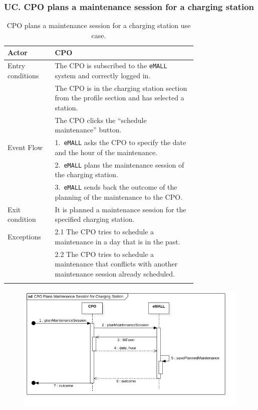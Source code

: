 \subsubsection*{UC\cuc . CPO plans a maintenance session for a charging station}
\begin{center}
    \begin{longtable}{lp{0.75\linewidth}}
        \hline
        Actor            & CPO                                                                                                            \\
        \hline
        Entry conditions & The CPO is subscribed to the \verb|eMALL| system and correctly logged in.                                      \\
        & The CPO is in the charging station section from the profile section and has selected a station.                \\
        & The CPO clicks the ``schedule maintenance'' button.                                                            \\
        \hline
        Event Flow       & 1.\ \verb|eMALL| asks the CPO to specify the date and the hour of the maintenance.                             \\
        & 2.\ \verb|eMALL| plans the maintenance session of the charging station.                                        \\
        & 3.\ \verb|eMALL| sends back the outcome of the planning of the maintenance to the CPO.                         \\
        \hline
        Exit condition   & It is planned a maintenance session for the specified charging station.                                        \\
        \hline
        Exceptions       & 2.1 The CPO tries to schedule a maintenance in a day that is in the past.                                      \\
        & 2.2 The CPO tries to schedule a maintenance that conflicts with another maintenance session already scheduled. \\
        \hline
        \caption{CPO plans a maintenance session for a charging station use case.}
        \label{tab: CPO_plans_maintenance_use_case}
    \end{longtable}
    \begin{figure} [H]
        \begin{center}
            \includegraphics[width=0.9\linewidth]{Images/SequenceDiagrams/cpo_plans_maintenance_session_for_charging_station}

\end{center}
\end{figure}
\end{center}
